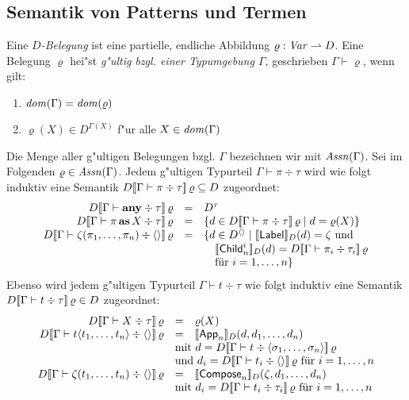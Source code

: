 \documentclass[%
  12pt,%
  a4paper,%
]{article}
\DeclareMathOperator{\as}{\textbf{as}}
\newcommand{\any}{\textbf{any}}
\newcommand{\Tj}[3]{{#1}\vdash{#2}\div{#3}}
\begin{document}
\subsection*{Semantik von Patterns und Termen}

Eine \emph{$D$-Belegung} ist eine partielle, endliche Abbildung $\varrho: \mathit{Var} \rightharpoonup D$. Eine Belegung
$\varrho$ hei"st \emph{g"ultig bzgl. einer Typumgebung $\Gamma$}, geschrieben $\Gamma \vdash \varrho$,
wenn gilt:
\begin{enumerate}
\item $\mathit{dom}(\Gamma) = \mathit{dom}(\varrho)$
\item $\varrho(X) \in D^{\Gamma(X)}$ f"ur alle $X \in \mathit{dom}(\Gamma)$
\end{enumerate}
Die Menge aller g"ultigen Belegungen bzgl. $\Gamma$ bezeichnen wir mit $\mathit{Assn}(\Gamma)$.
Sei im Folgenden $\varrho \in \mathit{Assn}(\Gamma)$.
Jedem g"ultigen Typurteil $\Tj{\Gamma}{\pi}{\tau}$ wird wie folgt induktiv
eine Semantik $D\sem{\Tj{\Gamma}{\pi}{\tau}}\,\varrho \subseteq D$ zugeordnet:
\[\begin{array}{rcl}
  D\sem{\Tj{\Gamma}{\any}{\tau}}\,\varrho
  &=& D^\tau
  \\
  D\sem{\Tj{\Gamma}{\pi \as X}{\tau}}\,\varrho
  &=& \{d \in D\sem{\Tj{\Gamma}{\pi}{\tau}}\,\varrho \mid d = \varrho(X) \}
  \\
  D\sem{\Tj{\Gamma}{\zeta(\pi_1,\ldots,\pi_n)}{\langle \rangle}}\,\varrho
  &=& \{ d \in D^{\langle \rangle} \mid \sem{\Label}_D(d) = \zeta \text{ und} \\
  && \quad \sem{\Child_n^i}_D(d) = D\sem{\Tj{\Gamma}{\pi_i}{\tau_i}}\,\varrho \\
  && \quad \text{f\"ur $i=1,\ldots,n$} \}
  \\
\end{array}\]
Ebenso wird jedem g"ultigen Typurteil $\Tj{\Gamma}{t}{\tau}$ wie folgt induktiv
eine Semantik $D\sem{\Tj{\Gamma}{t}{\tau}}\,\varrho \in D$ zugeordnet:
\[\begin{array}{rcl}
  D\sem{\Tj{\Gamma}{X}{\tau}}\,\varrho
  &=& \varrho(X)
  \\
  D\sem{\Tj{\Gamma}{t \langle t_1,\ldots,t_n \rangle}{\langle \rangle}}\,\varrho
  &=& \sem{\App_n}_D(d, d_1, \ldots, d_n) \\
  & \multicolumn{2}{l}{\text{mit } d = D\sem{\Tj{\Gamma}{t}{\langle\sigma_1,\ldots,\sigma_n\rangle}}\,\varrho} \\
  & \multicolumn{2}{l}{\text{und } d_i = D\sem{\Tj{\Gamma}{t_i}{\langle \rangle}}\,\varrho \text{ f\"ur $i=1,\ldots,n$}}
  \\
  D\sem{\Tj{\Gamma}{\zeta(t_1,\ldots,t_n)}{\langle \rangle}}\,\varrho
  &=& \sem{\Compose_n}_D(\zeta,d_1,\ldots,d_n) \\
  & \multicolumn{2}{l}{\text{mit } d_i = D\sem{\Tj{\Gamma}{t_i}{\tau_i}}\,\varrho \text{ f\"ur $i=1,\ldots,n$}}
  \\
\end{array}\]
\end{document}
